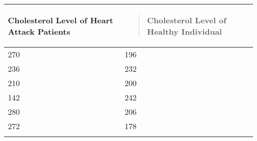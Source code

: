 \documentclass[]{book}
\begin{document}
\begin{longtable}[]{@{}ll@{}}
\toprule
\begin{minipage}[b]{0.47\columnwidth}\raggedright
Cholesterol Level of Heart Attack
Patients\strut
\end{minipage} & \begin{minipage}[b]{0.47\columnwidth}\raggedright
\begin{quote}
Cholesterol Level of Healthy
Individual
\end{quote}\strut
\end{minipage}\tabularnewline
\midrule
\endhead
\begin{minipage}[t]{0.47\columnwidth}\raggedright
270\strut
\end{minipage} & \begin{minipage}[t]{0.47\columnwidth}\raggedright
196\strut
\end{minipage}\tabularnewline
\begin{minipage}[t]{0.47\columnwidth}\raggedright
236\strut
\end{minipage} & \begin{minipage}[t]{0.47\columnwidth}\raggedright
232\strut
\end{minipage}\tabularnewline
\begin{minipage}[t]{0.47\columnwidth}\raggedright
210\strut
\end{minipage} & \begin{minipage}[t]{0.47\columnwidth}\raggedright
200\strut
\end{minipage}\tabularnewline
\begin{minipage}[t]{0.47\columnwidth}\raggedright
142\strut
\end{minipage} & \begin{minipage}[t]{0.47\columnwidth}\raggedright
242\strut
\end{minipage}\tabularnewline
\begin{minipage}[t]{0.47\columnwidth}\raggedright
280\strut
\end{minipage} & \begin{minipage}[t]{0.47\columnwidth}\raggedright
206\strut
\end{minipage}\tabularnewline
\begin{minipage}[t]{0.47\columnwidth}\raggedright
272\strut
\end{minipage} & \begin{minipage}[t]{0.47\columnwidth}\raggedright
178\strut
\end{minipage}\tabularnewline
\begin{minipage}[t]{0.47\columnwidth}\raggedright

\end{minipage}
\end{longtable}
\end{document}
